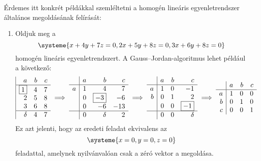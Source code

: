 \documentclass[9pt, a4paper, showtrims]{memoir}
\theoremstyle{plain}
\theoremstyle{remark}
\theoremstyle{definition}
\begin{document}
Érdemes itt konkrét példákkal szemléltetni a homogén lineáris egyenletrendszer általános megoldásának felírását:
\begin{enumerate}
    \item 
        Oldjuk meg a 
        \[
            \systeme{ x+4y+7z=0,
                2x+5y+8z=0,
                3x+6y+8z=0
            }
        \]
        homogén  lineáris egyenletrendszert.
        A Gauss--Jordan-algoritmus  lehet például a következő:
        \[
            \begin{array}{|rrr}
                a&b&c\\
                \hline
                \boxed{1}&4&7\\
                2&5&8\\
                3&6&8\\
                \hline
                \delta&4&7
            \end{array}
            \implies
            \begin{array}{r|rrr}
                &a&b&c\\
                \hline
                a &  1&4&7\\
                &  0&\boxed{-3}&-6\\
                &  0&-6&-13\\
                \hline
                &  0&\delta&2
            \end{array}
            \implies
            \begin{array}{r|rrr}
                &a&b&c\\
                \hline
                a &  1&0&-1\\
                b &  0&1&2\\
                &  0&0&\boxed{-1}\\
                \hline
                &  0&0&\delta
            \end{array}
            \implies
            \begin{array}{r|rrr}
                &a&b&c\\
                \hline
                a &  1&0&0\\
                b &  0&1&0\\
                c &  0&0&1
            \end{array}
        \]
        Ez azt jelenti, hogy az eredeti feladat ekvivalens az
        \[\systeme{x=0,y=0,z=0}\]
        feladattal, amelynek nyilvánvalóan csak a zéró vektor a megoldása.

\end{enumerate}
\end{document}
